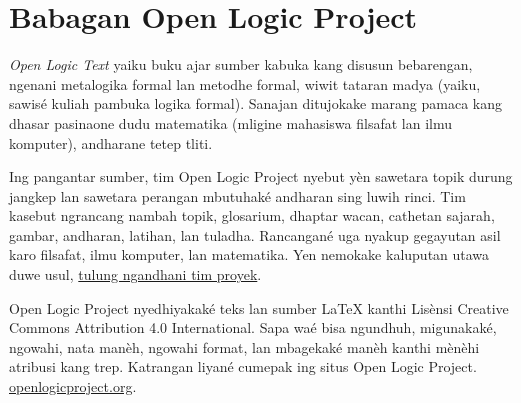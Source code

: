 
\begingroup
\chapter*{Babagan Open Logic Project}


\textit{Open Logic Text} yaiku buku ajar sumber kabuka kang disusun
bebarengan, ngenani metalogika formal lan metodhe formal, wiwit tataran
madya (yaiku, sawisé kuliah pambuka logika formal). Sanajan ditujokake
marang pamaca kang dhasar pasinaone dudu matematika (mligine mahasiswa
filsafat lan ilmu komputer), andharane tetep tliti.

Ing pangantar sumber, tim Open Logic Project nyebut yèn sawetara
topik durung jangkep lan sawetara perangan mbutuhaké andharan
sing luwih rinci.
Tim kasebut ngrancang nambah topik, glosarium, dhaptar wacan,
cathetan sajarah, gambar, andharan, latihan, lan tuladha.
Rancangané uga nyakup gegayutan asil karo filsafat, ilmu komputer,
lan matematika.
Yen nemokake kaluputan utawa duwe usul,
\href{https://github.com/OpenLogicProject/OpenLogic/wiki/Contributing}{tulung ngandhani tim proyek}.

Open Logic Project nyedhiyakaké teks lan sumber LaTeX kanthi
Lisènsi Creative Commons Attribution 4.0 International. Sapa waé
bisa ngundhuh, migunakaké, ngowahi, nata manèh, ngowahi format,
lan mbagekaké manèh kanthi mènèhi atribusi kang trep.
Katrangan liyané cumepak ing situs Open Logic Project.
\href{http://openlogicproject.org/}{openlogicproject.org}.

\endgroup
